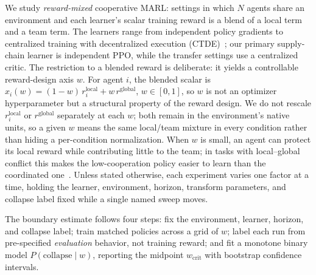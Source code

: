 \documentclass[letterpaper]{article} %
\theoremstyle{plain}
\newcommand{\wcrit}{w_{\mathrm{crit}}}
\begin{document}
We study \emph{reward-mixed} cooperative MARL: settings in which $N$ agents share an environment
and each learner's scalar training reward is a blend of a local term and a team term. The learners
range from independent policy gradients to centralized training with decentralized execution
(CTDE)~\citep{lowe2017multi}; our primary supply-chain learner is independent PPO, while the
transfer settings use a centralized critic. The restriction to a blended reward is deliberate: it
yields a controllable reward-design axis $w$. For agent $i$, the blended scalar is
$x_i(w)=(1-w)\,r_i^{\mathrm{local}}+w\,r^{\mathrm{global}}$, $w\in[0,1]$, so $w$ is not an optimizer
hyperparameter but a structural property of the reward design. We do not rescale
$r_i^{\mathrm{local}}$ or $r^{\mathrm{global}}$ separately at each $w$; both remain in the
environment's native units, so a given $w$ means the same local/team mixture in every condition
rather than hiding a per-condition normalization. When $w$ is small, an agent can protect its local
reward while contributing little to the team; in tasks with local--global conflict this makes the
low-cooperation policy easier to learn than the coordinated one~\citep{liu2023lazy,peng2023curo}.
Unless stated otherwise, each experiment varies one factor at a time, holding the learner,
environment, horizon, transform parameters, and collapse label fixed while a single named sweep
moves.

The boundary estimate follows four steps: fix the environment, learner, horizon, and collapse
label; train matched policies across a grid of $w$; label each run from pre-specified
\emph{evaluation} behavior, not training reward; and fit a monotone binary model
$P(\mathrm{collapse}\mid w)$, reporting the midpoint $\wcrit$ with bootstrap confidence intervals.
\end{document}
